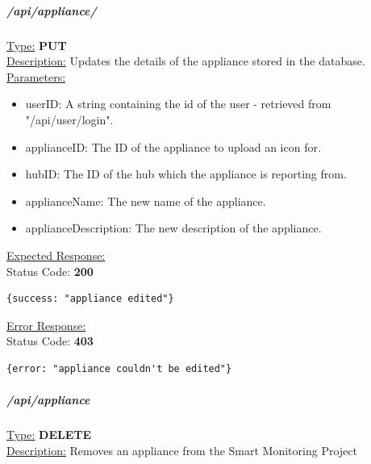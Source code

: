 \documentclass[draft,preprint,12pt,3p]{elsarticle}
\newcommand{\forceindent}{\leavevmode{\parindent=1em\indent}}
\begin{document}
\subparagraph*{/api/appliance/}
\underline{Type:} \textbf{PUT}\\

\underline{Description:} Updates the details of the appliance stored in the database.\\

\underline{Parameters:}
\begin{itemize}
\item userID: A string containing the id of the user - retrieved from "/api/user/login".

\item applianceID: The ID of the appliance to upload an icon for.

\item hubID: The ID of the hub which the appliance is reporting from.

\item applianceName: The new name of the appliance.

\item applianceDescription: The new description of the appliance.
\end{itemize}

\underline{Expected Response:}\\[5pt]
\forceindent Status Code: \textbf{200} \\
\begin{verbatim}
{success: "appliance edited"}
\end{verbatim}
\underline{Error Response:}\\[5pt]
\forceindent Status Code: \textbf{403} \\
\begin{verbatim}
{error: "appliance couldn't be edited"}
\end{verbatim}

\subparagraph*{/api/appliance}
\underline{Type:} \textbf{DELETE}\\

\underline{Description:} Removes an appliance from the Smart Monitoring Project\\
\end{document}
